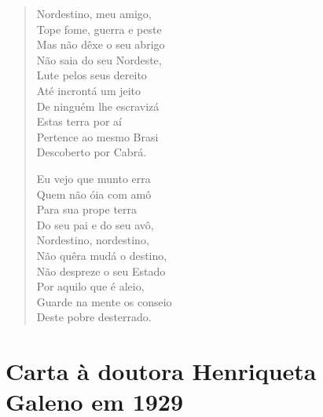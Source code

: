 \begin{verse}
Nordestino, meu amigo,\\
Tope fome, guerra e peste\\
Mas não dêxe o seu abrigo\\
Não saia do seu Nordeste,\\
Lute pelos seus dereito\\
Até incrontá um jeito\\
De ninguém lhe escravizá\\
Estas terra por aí\\
Pertence ao mesmo Brasi\\
Descoberto por Cabrá.

Eu vejo que munto erra\\
Quem não óia com amô\\
Para sua prope terra\\
Do seu pai e do seu avô,\\
Nordestino, nordestino,\\
Não quêra mudá o destino,\\
Não despreze o seu Estado\\
Por aquilo que é aleio,\\
Guarde na mente os conseio\\
Deste pobre desterrado.
\end{verse}

\chapter{Carta à doutora Henriqueta Galeno em 1929}

